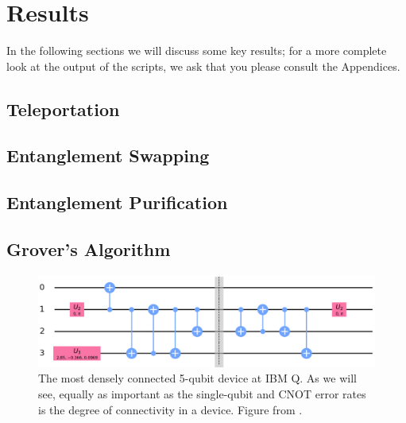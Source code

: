 \section{Results}
In the following sections we will discuss some key results; for a more complete
look at the output of the scripts, we ask that you please consult the Appendices.

\subsection{Teleportation}


\subsection{Entanglement Swapping}
\subsection{Entanglement Purification}
\subsection{Grover's Algorithm}

\begin{figure}[ht]
  \centering \includegraphics[width=\textwidth]{images/swap_burlington.png}
  \caption{The most densely connected 5-qubit device at IBM Q. As we will see,
    equally as important as the single-qubit and CNOT error rates is the degree
    of connectivity in a device. Figure from \cite{ibmq_yorktown}.}
  \label{fig:yorktown_connections}
\end{figure}

